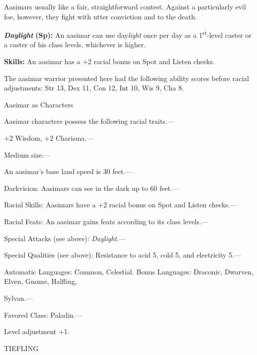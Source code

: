 \documentclass{article}
\begin{document}
Aasimars usually like a fair, straightforward contest. Against a particularly evil 
foe, however, they fight with utter conviction and to the death.

\textit{\textbf{Daylight }}\textbf{(Sp):} An aasimar can use day\textit{light }once 
per day as a 1\textsuperscript{st}-level caster or a caster of his class levels, 
whichever is higher.

\textbf{Skills:} An aasimar has a +2 racial bonus on Spot and Listen checks.

The aasimar warrior presented here had the following ability scores before racial 
adjustments: Str 13, Dex 11, Con 12, Int 10, Wis 9, Cha 8.

Aasimar as Characters

Aasimar characters possess the following racial traits.--- 

\parindent=3pt
+2 Wisdom, +2 Charisma.---

\parindent=0pt
Medium size.---

An aasimar's base land speed is 30 feet.---

Darkvision: Aasimars can see in the dark up to 60 feet.---

Racial Skills: Aasimars have a +2 racial bonus on Spot and Listen checks.---

Racial Feats: An aasimar gains feats according to its class levels.---

Special Attacks (see above): \textit{Daylight}.---

Special Qualities (see above): Resistance to acid 5, cold 5, and electricity 5.---

Automatic Languages: Common, Celestial. Bonus Languages: Draconic, Dwarven, Elven, 
Gnome, Halfling,

Sylvan.---

Favored Class: Paladin.---

Level adjustment +1.

\vspace{12pt}
TIEFLING
\end{document}
